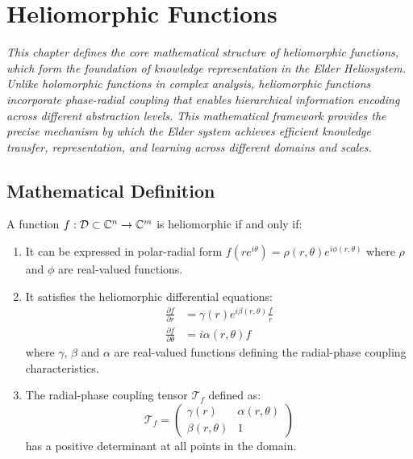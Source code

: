 \chapter{Heliomorphic Functions}

\textit{This chapter defines the core mathematical structure of heliomorphic functions, which form the foundation of knowledge representation in the Elder Heliosystem. Unlike holomorphic functions in complex analysis, heliomorphic functions incorporate phase-radial coupling that enables hierarchical information encoding across different abstraction levels. This mathematical framework provides the precise mechanism by which the Elder system achieves efficient knowledge transfer, representation, and learning across different domains and scales.}

\section{Mathematical Definition}

\begin{definition}
A function $f: \mathcal{D} \subset \mathbb{C}^n \rightarrow \mathbb{C}^m$ is heliomorphic if and only if:
\begin{enumerate}
    \item It can be expressed in polar-radial form $f(re^{i\theta}) = \rho(r,\theta)e^{i\phi(r,\theta)}$ where $\rho$ and $\phi$ are real-valued functions.
    
    \item It satisfies the heliomorphic differential equations:
    \begin{align}
        \frac{\partial f}{\partial r} &= \gamma(r)e^{i\beta(r,\theta)}\frac{f}{r}\\
        \frac{\partial f}{\partial \theta} &= i\alpha(r,\theta)f
    \end{align}
    where $\gamma$, $\beta$ and $\alpha$ are real-valued functions defining the radial-phase coupling characteristics.
    
    \item The radial-phase coupling tensor $\mathcal{T}_f$ defined as:
    \begin{equation}
        \mathcal{T}_f = \begin{pmatrix}
            \gamma(r) & \alpha(r,\theta)\\
            \beta(r,\theta) & 1
        \end{pmatrix}
    \end{equation}
    has a positive determinant at all points in the domain.
\end{enumerate}
\end{definition}

